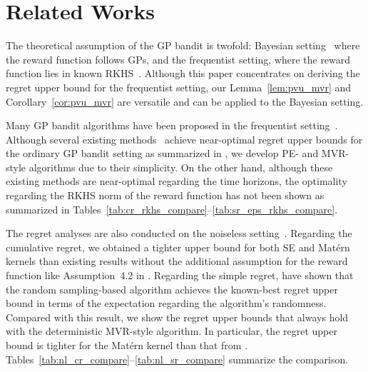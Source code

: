 \section{Related Works}
The theoretical assumption of the GP bandit is twofold: Bayesian setting~\citep{srinivas10gaussian,freitas2012exponential,Russo2014-learning,scarlett2018tight,takeno2023-randomized,takeno2024-posterior} where the reward function follows GPs, and the frequentist setting, where the reward function lies in known RKHS~\citep{srinivas10gaussian,chowdhury2017kernelized,vakili2021optimal,li2022gaussian}.
%
Although this paper concentrates on deriving the regret upper bound for the frequentist setting, our Lemma~\ref{lem:pvu_mvr} and Corollary~\ref{cor:pvu_mvr} are versatile and can be applied to the Bayesian setting.


Many GP bandit algorithms have been proposed in the frequentist setting~\citep[for example, ][]{srinivas10gaussian,valko2013finite,chowdhury2017kernelized,janz2020bandit,vakili2021optimal,li2022gaussian}.
%
Although several existing methods~\citep{valko2013finite,janz2020bandit,camilleri2021high,salgia2021domain,li2022gaussian} achieve near-optimal regret upper bounds for the ordinary GP bandit setting as summarized in \citep{li2022gaussian}, we develop PE- and MVR-style algorithms due to their simplicity.
%
On the other hand, although these existing methods are near-optimal regarding the time horizons, the optimality regarding the RKHS norm of the reward function has not been shown as summarized in Tables~\ref{tab:cr_rkhs_compare}--\ref{tab:sr_eps_rkhs_compare}.


The regret analyses are also conducted on the noiseless setting~\citep{bull2011convergence,lyu2019efficient,vakili2022open,salgiarandom,kim2024bayesian,flynn2024tighter}.
%
Regarding the cumulative regret, we obtained a tighter upper bound for both SE and Mat\'ern kernels than existing results without the additional assumption for the reward function like Assumption~4.2 in \citep{salgia2021domain}.
%
Regarding the simple regret, \citet{kim2024bayesian} have shown that the random sampling-based algorithm achieves the known-best regret upper bound in terms of the expectation regarding the algorithm's randomness.
% 
Compared with this result, we show the regret upper bounds that always hold with the deterministic MVR-style algorithm.
%
In particular, the regret upper bound is tighter for the Mat\'ern kernel than that from \citep{kim2024bayesian}.
%
Tables~\ref{tab:nl_cr_compare}--\ref{tab:nl_sr_compare} summarize the comparison.


